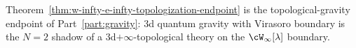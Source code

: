 Theorem~\ref{thm:w-infty-e-infty-topologization-endpoint} is the
topological-gravity endpoint of Part~\ref{part:gravity}: 3d
quantum gravity with Virasoro boundary is the \(N=2\) shadow of a
3d$+\infty$-topological theory on the $\cW_\infty[\lambda]$
boundary.

